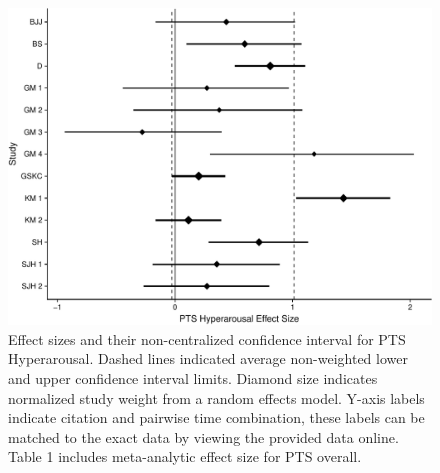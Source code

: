 \documentclass[man, mask]{apa6}
\theoremstyle{definition}
\theoremstyle{definition}
\theoremstyle{definition}
\theoremstyle{remark}
\begin{document}
\begin{figure}[htbp]
\centering
\includegraphics{meta_markdown_files/figure-latex/ptspichyper-1.pdf}
\caption{\label{fig:ptspichyper}Effect sizes and their non-centralized
confidence interval for PTS Hyperarousal. Dashed lines indicated average
non-weighted lower and upper confidence interval limits. Diamond size
indicates normalized study weight from a random effects model. Y-axis
labels indicate citation and pairwise time combination, these labels can
be matched to the exact data by viewing the provided data online. Table
1 includes meta-analytic effect size for PTS overall.}
\end{figure}
\end{document}
